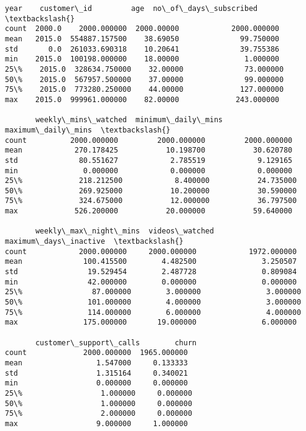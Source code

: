 \documentclass[11pt]{article}
\makeatletter
\newcommand{\boxspacing}{\kern\kvtcb@left@rule\kern\kvtcb@boxsep}
\newcommand{\prompt}[4]{
        {\ttfamily\llap{{\color{#2}[#3]:\hspace{3pt}#4}}\vspace{-\baselineskip}}
    }
\makeatother
\begin{document}
            \begin{tcolorbox}[breakable, size=fbox, boxrule=.5pt, pad at break*=1mm, opacityfill=0]
\prompt{Out}{outcolor}{24}{\boxspacing}
\begin{Verbatim}[commandchars=\\\{\}]
         year    customer\_id         age  no\_of\_days\_subscribed  \textbackslash{}
count  2000.0    2000.000000  2000.00000            2000.000000
mean   2015.0  554887.157500    38.69050              99.750000
std       0.0  261033.690318    10.20641              39.755386
min    2015.0  100198.000000    18.00000               1.000000
25\%    2015.0  328634.750000    32.00000              73.000000
50\%    2015.0  567957.500000    37.00000              99.000000
75\%    2015.0  773280.250000    44.00000             127.000000
max    2015.0  999961.000000    82.00000             243.000000

       weekly\_mins\_watched  minimum\_daily\_mins  maximum\_daily\_mins  \textbackslash{}
count          2000.000000         2000.000000         2000.000000
mean            270.178425           10.198700           30.620780
std              80.551627            2.785519            9.129165
min               0.000000            0.000000            0.000000
25\%             218.212500            8.400000           24.735000
50\%             269.925000           10.200000           30.590000
75\%             324.675000           12.000000           36.797500
max             526.200000           20.000000           59.640000

       weekly\_max\_night\_mins  videos\_watched  maximum\_days\_inactive  \textbackslash{}
count            2000.000000     2000.000000            1972.000000
mean              100.415500        4.482500               3.250507
std                19.529454        2.487728               0.809084
min                42.000000        0.000000               0.000000
25\%                87.000000        3.000000               3.000000
50\%               101.000000        4.000000               3.000000
75\%               114.000000        6.000000               4.000000
max               175.000000       19.000000               6.000000

       customer\_support\_calls        churn
count             2000.000000  1965.000000
mean                 1.547000     0.133333
std                  1.315164     0.340021
min                  0.000000     0.000000
25\%                  1.000000     0.000000
50\%                  1.000000     0.000000
75\%                  2.000000     0.000000
max                  9.000000     1.000000
\end{Verbatim}
\end{tcolorbox}
        
\end{document}
